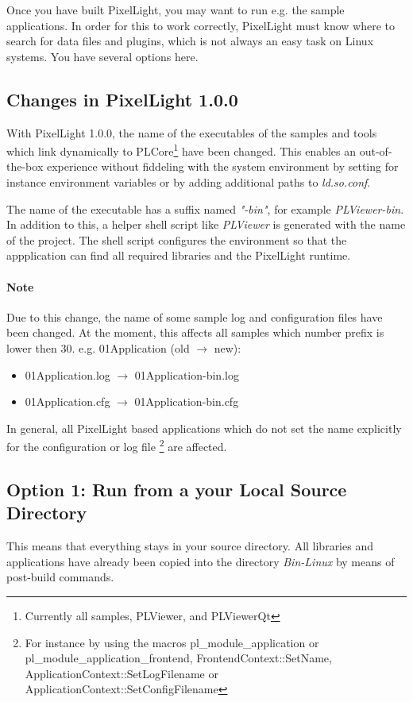 Once you have built PixelLight, you may want to run e.g. the sample applications. In order for this to work correctly, PixelLight must know where to search for data files and plugins, which is not always an easy task on Linux systems. You have several options here.



\subsection{Changes in PixelLight 1.0.0}
With PixelLight 1.0.0, the name of the executables of the samples and tools which link dynamically to PLCore\footnote{Currently all samples, PLViewer, and PLViewerQt} have been changed. This enables an out-of-the-box experience without fiddeling with the system environment by setting for instance environment variables or by adding additional paths to \emph{ld.so.conf}.

The name of the executable has a suffix named \emph{"-bin"}, for example \emph{PLViewer-bin}. In addition to this, a helper shell script like \emph{PLViewer} is generated with the name of the project. The shell script configures the environment so that the appplication can find all required libraries and the PixelLight runtime.


\paragraph{Note}
Due to this change, the name of some sample log and configuration files have been changed. At the moment, this affects all samples which number prefix is lower then 30. e.g. 01Application (old $\to$ new):
\begin{samepage}
	\begin{itemize}
		\item 01Application.log $\to$ 01Application-bin.log
		\item 01Application.cfg $\to$ 01Application-bin.cfg
	\end{itemize}
\end{samepage}

In general, all PixelLight based applications which do not set the name explicitly for the configuration or log file \footnote{For instance by using the macros pl\_module\_application or pl\_module\_application\_frontend, FrontendContext::SetName, ApplicationContext::SetLogFilename or ApplicationContext::SetConfigFilename} are affected.



\subsection{Option 1: Run from a your Local Source Directory}
This means that everything stays in your source directory. All libraries and applications have already been copied into the directory \emph{Bin-Linux} by means of post-build commands.

